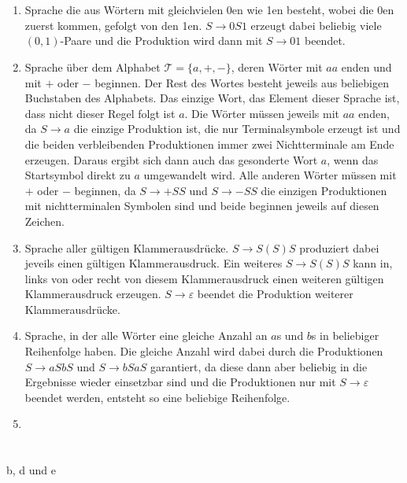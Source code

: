 \documentclass[a4paper,10pt]{scrartcl}
\begin{document}
\section{}
\begin{enumerate}
 \item	Sprache die aus Wörtern mit gleichvielen 0en wie 1en besteht, wobei die
0en zuerst kommen, gefolgt von den 1en. 
	$S \to 0S1$ erzeugt dabei beliebig viele $(0,1)$-Paare und die
Produktion wird dann mit $S \to 01$ beendet.
 \item	Sprache über dem Alphabet $\mathcal{T} = \{a,
	+, -\}$, deren Wörter mit $aa$ enden und mit $+$ oder $-$
  beginnen.
	Der Rest des Wortes besteht jeweils aus beliebigen Buchstaben des
  Alphabets.
	Das einzige Wort, das Element dieser Sprache ist, dass nicht dieser
Regel folgt ist $a$.
	Die Wörter müssen jeweils mit $aa$ enden, da $S \to a$ die einzige
	Produktion ist, die nur Terminalsymbole erzeugt ist und die beiden
	verbleibenden Produktionen immer zwei Nichtterminale am Ende erzeugen.
	Daraus ergibt sich dann auch das gesonderte Wort $a$, wenn das
Startsymbol direkt zu $a$ umgewandelt wird. 
	Alle anderen Wörter müssen mit $+$ oder $-$ beginnen, da $S \to +SS$
und $S \to -SS$ die einzigen Produktionen mit nichtterminalen Symbolen sind
 und beide beginnen jeweils auf diesen Zeichen.
 \item	Sprache aller gültigen Klammerausdrücke. $S \to S (S) S$ produziert
dabei jeveils einen gültigen Klammerausdruck. Ein weiteres $S \to S (S) S$ kann
in, links von oder recht von diesem Klammerausdruck einen weiteren gültigen
Klammerausdruck erzeugen. $S \to \varepsilon$ beendet die Produktion weiterer
Klammerausdrücke.
 \item	Sprache, in der alle Wörter eine gleiche Anzahl an $a$s und $b$s in
beliebiger Reihenfolge haben. Die gleiche Anzahl wird dabei durch die
Produktionen $S \to aSbS$ und $S \to bSaS$ garantiert, da diese dann aber
beliebig in die Ergebnisse wieder einsetzbar sind und die Produktionen nur mit
$S \to \varepsilon$ beendet werden, entsteht so eine beliebige Reihenfolge.
 \item	
\end{enumerate}

\section{}
b, d und e
\end{document}
